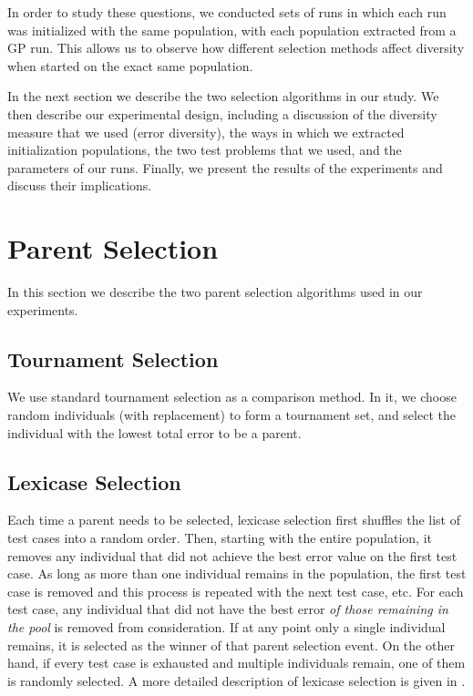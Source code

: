 \documentclass{sig-alternate-05-2015}
\begin{document}
In order to study these questions, we conducted sets of runs in which each run was initialized with the same population, with each population extracted from a GP run. This allows us to observe how different selection methods affect diversity when started on the exact same population.

In the next section we describe the two selection algorithms in our study. We then describe our experimental design, including a discussion of the diversity measure that we used (error diversity), the ways in which we extracted initialization populations, the two test problems that we used, and the parameters of our runs. Finally, we present the results of the experiments and discuss their implications.


\section{Parent Selection}

In this section we describe the two parent selection algorithms used in our experiments.

\subsection{Tournament Selection}

We use standard tournament selection as a comparison method. In it, we choose random individuals (with replacement) to form a tournament set, and select the individual with the lowest total error to be a parent.

%

\subsection{Lexicase Selection}

Each time a parent needs to be selected, lexicase selection first shuffles the list of test cases into a random order. Then, starting with the entire population, it removes any individual that did not achieve the best error value on the first test case. As long as more than one individual remains in the population, the first test case is removed and this process is repeated with the next test case, etc. For each test case, any individual that did not have the best error \textit{of those remaining in the pool} is removed from consideration. If at any point only a single individual remains, it is selected as the winner of that parent selection event. On the other hand, if every test case is exhausted and multiple individuals remain, one of them is randomly selected. A more detailed description of lexicase selection is given in \cite{Helmuth:2015:ieeeTEC}.
\end{document}
